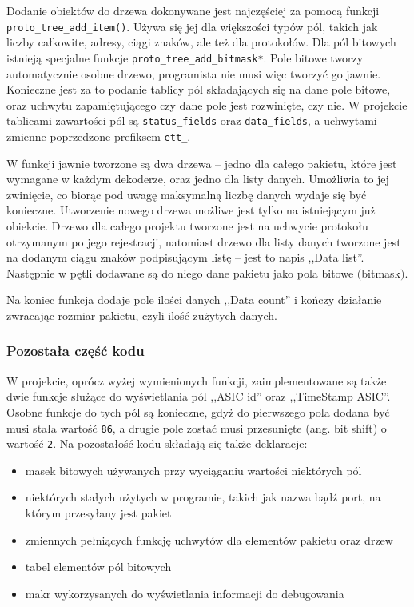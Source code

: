 \documentclass[a4paper, 12pt, twoside, openright]{article}
\begin{document}
Dodanie obiektów do drzewa dokonywane jest najczęściej za pomocą funkcji \texttt{proto\_tree\_add\_item()}.
Używa się jej dla większości typów pól, takich jak liczby całkowite, adresy, ciągi znaków, ale też dla protokołów.
Dla pól bitowych istnieją specjalne funkcje \texttt{proto\_tree\_add\_bitmask*}. Pole bitowe tworzy automatycznie
osobne drzewo, programista nie musi więc tworzyć go jawnie. Konieczne jest za to podanie tablicy pól składających
się na dane pole bitowe, oraz uchwytu zapamiętującego czy dane pole jest rozwinięte, czy nie. W projekcie tablicami
zawartości pól są \texttt{status\_fields} oraz \texttt{data\_fields}, a uchwytami zmienne poprzedzone prefiksem \texttt{ett\_}.

W funkcji jawnie tworzone są dwa drzewa -- jedno dla całego pakietu, które jest wymagane w każdym dekoderze, oraz jedno
dla listy danych. Umożliwia to jej zwinięcie, co biorąc pod uwagę maksymalną liczbę danych wydaje się być konieczne.
Utworzenie nowego drzewa możliwe jest tylko na istniejącym już obiekcie. Drzewo dla całego projektu
tworzone jest na uchwycie protokołu otrzymanym po jego rejestracji, natomiast drzewo dla listy danych tworzone jest na dodanym
ciągu znaków podpisującym listę -- jest to napis ,,Data list''. Następnie w pętli dodawane są do niego dane pakietu jako pola bitowe $($bitmask$)$.

Na koniec funkcja dodaje pole ilości danych ,,Data count'' i kończy działanie zwracając rozmiar pakietu, czyli ilość zużytych danych.

\subsubsection{Pozostała część kodu}
W projekcie, oprócz wyżej wymienionych funkcji, zaimplementowane są także dwie funkcje służące do wyświetlania pól ,,ASIC id'' oraz ,,TimeStamp ASIC''.
Osobne funkcje do tych pól są konieczne, gdyż do pierwszego pola dodana być musi stała wartość \texttt{86}, a drugie pole zostać musi przesunięte (ang. bit shift)
o wartość \texttt{2}. Na pozostałość kodu składają się także deklaracje:
\begin{itemize}
	\item masek bitowych używanych przy wyciąganiu wartości niektórych pól
	\item niektórych stałych użytych w programie, takich jak nazwa bądź port, na którym przesyłany jest pakiet
	\item zmiennych pełniących funkcję uchwytów dla elementów pakietu oraz drzew
	\item tabel elementów pól bitowych
	\item makr wykorzysanych do wyświetlania informacji do debugowania
\end{itemize}
\end{document}
